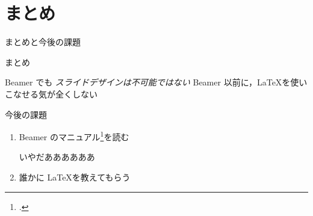 \section{まとめ}

\begin{frame}{まとめと今後の課題}
  \begin{block}{まとめ}
  \begin{enumerate}
    \okitem Beamer でも \emph{スライドデザインは不可能ではない}
    \butitem Beamer 以前に，\LaTeX を使いこなせる気が全くしない
  \end{enumerate}
  \end{block}
  
  \begin{block}{今後の課題}
  \begin{enumerate}
  \item
    Beamer のマニュアル\footcite{beamerguide}を読む
    \begin{itemize}
      \ngitem いやだああああああ
    \end{itemize}
  \item
    誰かに \LaTeX を教えてもらう
  \end{enumerate}
  \end{block}
  
\end{frame}
